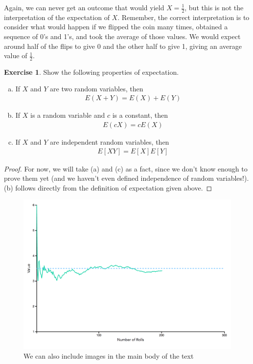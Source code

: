 \documentclass{tufte-book}
\theoremstyle{definition}
\numberwithin{theorem}{section}
\numberwithin{definition}{section}
\numberwithin{lemma}{section}
\numberwithin{corollary}{section}
\numberwithin{proposition}{section}
\numberwithin{remark}{section}
\numberwithin{claim}{section}
\numberwithin{observation}{section}
\numberwithin{fact}{section}
\numberwithin{assumption}{section}
\numberwithin{example}{section}
\newtheorem{exercise}[theorem]{Exercise}
\numberwithin{exercise}{section}
\begin{document}
Again, we can never get an outcome that would yield $X = \frac{1}{2}$, but this is not the interpretation of the expectation of $X$. Remember, the correct interpretation is to consider what would happen if we flipped the coin many times, obtained a sequence of 0's and 1's, and took the average of those values. We would expect around half of the flips to give 0 and the other half to give 1, giving an average value of $\frac{1}{2}$.

\begin{exercise}
Show the following properties of expectation.
\begin{enumerate}[(a)]
\item If $X$ and $Y$ are two random variables, then
\begin{align*}
E(X + Y) = E(X) + E(Y)
\end{align*}

\item If $X$ is a random variable and $c$ is a constant, then
\begin{align*}
E(cX) = cE(X)
\end{align*}

\item If $X$ and $Y$ are independent random variables, then
\begin{align*}
    E[XY] = E[X]E[Y]
\end{align*}
\end{enumerate}
\end{exercise}

\begin{proof}
For now, we will take (a) and (c) as a fact, since we don't know enough to prove them yet (and we haven't even defined independence of random variables!). (b) follows directly from the definition of expectation given above.
\end{proof}

\begin{figure}
  \includegraphics{expectation.png}
  \caption{We can also include images in the main body of the text}
\end{figure}
\end{document}
